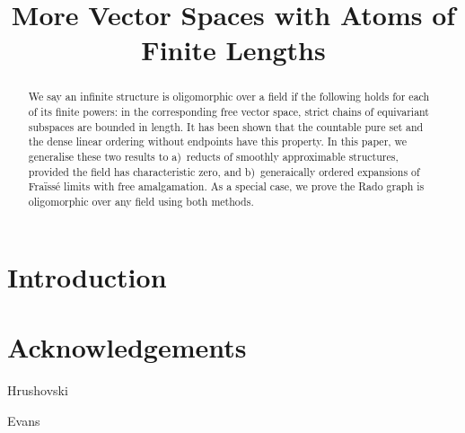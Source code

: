 \documentclass[conference]{IEEEtran}
\theoremstyle{definition}
\theoremstyle{remark}
\begin{document}
\title{More Vector Spaces with Atoms of Finite Lengths
}

\author{

\and

\and
}

\maketitle

\begin{abstract}
    We say an infinite structure is oligomorphic over a field 
    if the following holds for each of its finite powers:
    in the corresponding free vector space, strict chains of equivariant subspaces are bounded in length.
    It has been  shown that the countable pure set and the dense linear ordering without endpoints have this property.
    In this paper, we generalise these two results to
    a)~reducts of smoothly approximable structures, provided the field has characteristic zero, and
    b)~generaically ordered expansions of Fraïssé limits with free amalgamation.
    As a special case, we prove the Rado graph is oligomorphic over any field using both methods.
\end{abstract}


\section{Introduction}




\section*{Acknowledgements}
Hrushovski

Evans

\printbibliography
\end{document}
